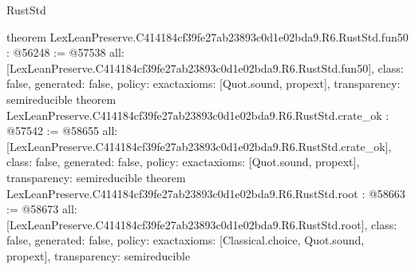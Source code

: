 \begin{lexlean}{RustStd}
\begin{coremodule}
{}
theorem LexLeanPreserve.C414184cf39fe27ab23893c0d1e02bda9.R6.RustStd.fun50 : @56248 := @57538 {
  all: [LexLeanPreserve.C414184cf39fe27ab23893c0d1e02bda9.R6.RustStd.fun50],
  class: false,
  generated: false,
  policy: exact{axioms: [Quot.sound, propext]},
  transparency: semireducible
}
theorem LexLeanPreserve.C414184cf39fe27ab23893c0d1e02bda9.R6.RustStd.crate_ok : @57542 := @58655 {
  all: [LexLeanPreserve.C414184cf39fe27ab23893c0d1e02bda9.R6.RustStd.crate_ok],
  class: false,
  generated: false,
  policy: exact{axioms: [Quot.sound, propext]},
  transparency: semireducible
}
theorem LexLeanPreserve.C414184cf39fe27ab23893c0d1e02bda9.R6.RustStd.root : @58663 := @58673 {
  all: [LexLeanPreserve.C414184cf39fe27ab23893c0d1e02bda9.R6.RustStd.root],
  class: false,
  generated: false,
  policy: exact{axioms: [Classical.choice, Quot.sound, propext]},
  transparency: semireducible
}


\end{coremodule}
\end{lexlean}

